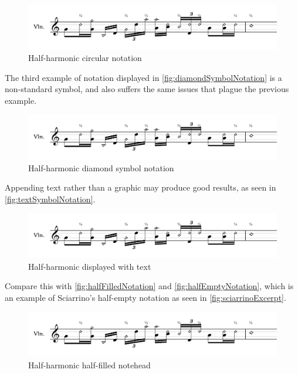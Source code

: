 \begin{figure}
    \includegraphics[page=3,width=\textwidth]{resources/halfharmonicsExampleNotation.pdf}
    \caption{Half-harmonic circular notation} \label{fig:circleExample}
  \end{figure}

The third example of notation displayed in \autoref{fig:diamondSymbolNotation} is a non-standard symbol, and also suffers the same issues that plague the previous example.

\begin{figure}
  \includegraphics[page=4,width=\textwidth]{resources/halfharmonicsExampleNotation.pdf}
  \caption{Half-harmonic diamond symbol notation} \label{fig:diamondSymbolNotation}
\end{figure}

Appending text rather than a graphic may produce good results, as seen in \autoref{fig:textSymbolNotation}.

\begin{figure}
  \includegraphics[page=1,width=\textwidth]{resources/halfharmonicsExampleNotation.pdf}
  \caption{Half-harmonic displayed with text} \label{fig:textSymbolNotation}
\end{figure}

Compare this with \autoref{fig:halfFilledNotation} and \autoref{fig:halfEmptyNotation}, which is an example of Sciarrino's half-empty notation as seen in \autoref{fig:sciarrinoExcerpt}.

\begin{figure}
  \includegraphics[page=5,width=\textwidth]{resources/halfharmonicsExampleNotation.pdf}
  \caption{Half-harmonic half-filled notehead} \label{fig:halfFilledNotation}
\end{figure}


